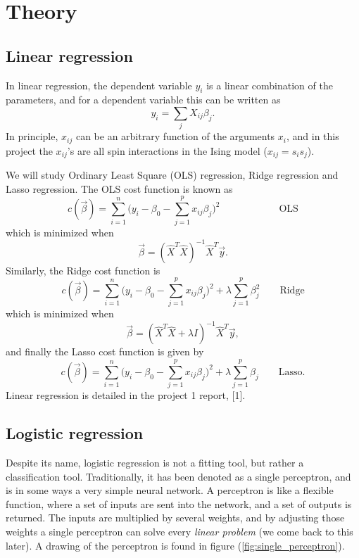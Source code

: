 \section{Theory} \label{sec:theory}

\subsection{Linear regression}
In linear regression, the dependent variable $y_i$ is a linear combination of the parameters, and for a dependent variable this can be written as
	\begin{equation}
	y_i=\sum_jX_{ij}\beta_j.
	\end{equation}
	In principle, $x_{ij}$ can be an arbitrary function of the arguments $x_i$, and in this project the $x_{ij}$'s are all spin interactions in the Ising model ($x_{ij}=s_is_j$).
	
	We will study Ordinary Least Square (OLS) regression, Ridge regression and Lasso regression. The OLS cost function is known as
	\begin{equation}
	c(\vec{\beta})=\sum_{i=1}^{n}\Big(y_i-\beta_0-\sum_{j=1}^px_{ij}\beta_j\Big)^2\qquad\qquad\qquad\text{OLS}
	\end{equation}
	which is minimized when
	\begin{equation}
	\vec{\beta}=(\hat{X}^T\hat{X})^{-1}\hat{X}^T\vec{y}.
	\end{equation}
	Similarly, the Ridge cost function is
	\begin{equation}
	c(\vec{\beta})=\sum_{i=1}^{n}\Big(y_i-\beta_0-\sum_{j=1}^px_{ij}\beta_j\Big)^2+\lambda\sum_{j=1}^p\beta_j^2\qquad\text{Ridge}
	\end{equation}
	which is minimized when
	\begin{equation}
	\vec{\beta}=(\hat{X}^T\hat{X}+\lambda I)^{-1}\hat{X}^T\vec{y},
	\end{equation}
	and finally the Lasso cost function is given by
	\begin{equation}
	c(\vec{\beta})=\sum_{i=1}^{n}\Big(y_i-\beta_0-\sum_{j=1}^px_{ij}\beta_j\Big)^2+\lambda\sum_{j=1}^p\beta_j\qquad\text{Lasso}.
	\end{equation}
Linear regression is detailed in the project 1 report, [1].


\subsection{Logistic regression}
Despite its name, logistic regression is not a fitting tool, but rather a classification tool. Traditionally, it has been denoted as a single perceptron, and is in some ways a very simple neural network. A perceptron is like a flexible function, where a set of inputs are sent into the network, and a set of outputs is returned. The inputs are multiplied by several weights, and by adjusting those weights a single perceptron can solve every \textit{linear problem} (we come back to this later). A drawing of the perceptron is found in figure (\ref{fig:single_perceptron}).

